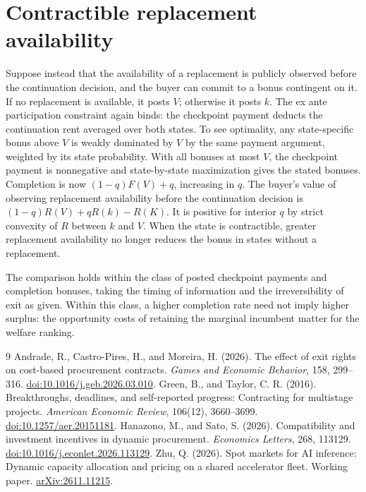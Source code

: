 \documentclass[11pt]{article}
\begin{document}
\section{Contractible replacement availability}\label{sec:timing}
Suppose instead that the availability of a replacement is publicly observed before the continuation decision, and the buyer can commit to a bonus contingent on it. If no replacement is available, it posts $V$; otherwise it posts $k$. The ex ante participation constraint again binds: the checkpoint payment deducts the continuation rent averaged over both states. To see optimality, any state-specific bonus above $V$ is weakly dominated by $V$ by the same payment argument, weighted by its state probability. With all bonuses at most $V$, the checkpoint payment is nonnegative and state-by-state maximization gives the stated bonuses. Completion is now $(1-q)F(V)+q$, increasing in $q$. The buyer's value of observing replacement availability before the continuation decision is $(1-q)R(V)+qR(k)-R(K)$. It is positive for interior $q$ by strict convexity of $R$ between $k$ and $V$. When the state is contractible, greater replacement availability no longer reduces the bonus in states without a replacement.

The comparison holds within the class of posted checkpoint payments and completion bonuses, taking the timing of information and the irreversibility of exit as given. Within this class, a higher completion rate need not imply higher surplus: the opportunity costs of retaining the marginal incumbent matter for the welfare ranking.

\begin{thebibliography}{9}
Andrade, R., Castro-Pires, H., and Moreira, H. (2026).
The effect of exit rights on cost-based procurement contracts.
\textit{Games and Economic Behavior}, 158, 299--316.
\href{https://doi.org/10.1016/j.geb.2026.03.010}{doi:10.1016/j.geb.2026.03.010}.
Green, B., and Taylor, C. R. (2016).
Breakthroughs, deadlines, and self-reported progress: Contracting for multistage projects.
\textit{American Economic Review}, 106(12), 3660--3699.
\href{https://doi.org/10.1257/aer.20151181}{doi:10.1257/aer.20151181}.
Hanazono, M., and Sato, S. (2026).
Compatibility and investment incentives in dynamic procurement.
\textit{Economics Letters}, 268, 113129.
\href{https://doi.org/10.1016/j.econlet.2026.113129}{doi:10.1016/j.econlet.2026.113129}.
Zhu, Q. (2026).
Spot markets for AI inference: Dynamic capacity allocation and pricing on a shared accelerator fleet.
Working paper. \href{https://arxiv.org/abs/2611.11215}{arXiv:2611.11215}.
\end{thebibliography}
\end{document}
